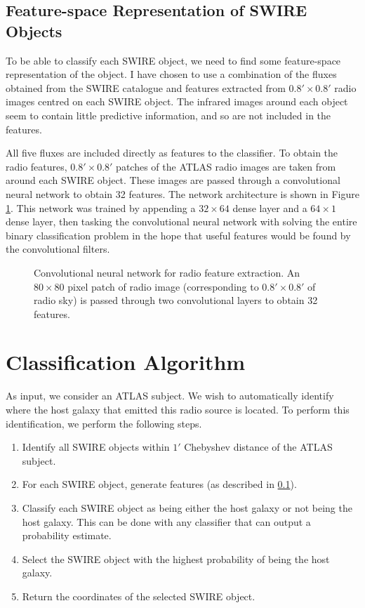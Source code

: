 \documentclass[a4paper]{article}
\newcommand{\fig}{Figure }
\begin{document}
    \subsection{Feature-space Representation of SWIRE Objects}
    \label{sec:features}

      To be able to classify each SWIRE object, we need to find some feature-space representation of the object. I have chosen to use a combination of the fluxes obtained from the SWIRE catalogue and features extracted from $0.8' \times 0.8'$ radio images centred on each SWIRE object. The infrared images around each object seem to contain little predictive information, and so are not included in the features.

      All five fluxes are included directly as features to the classifier. To obtain the radio features, $0.8' \times 0.8'$ patches of the ATLAS radio images are taken from around each SWIRE object. These images are passed through a convolutional neural network to obtain 32 features. The network architecture is shown in \fig \ref{fig:cnn}. This network was trained by appending a $32 \times 64$ dense layer and a $64 \times 1$ dense layer, then tasking the convolutional neural network with solving the entire binary classification problem in the hope that useful features would be found by the convolutional filters.

      \begin{figure}
        \centering
        
        \caption{Convolutional neural network for radio feature extraction. An $80 \times 80$ pixel patch of radio image (corresponding to $0.8' \times 0.8'$ of radio sky) is passed through two convolutional layers to obtain 32 features.}
        \label{fig:cnn}
      \end{figure}

  \section{Classification Algorithm}

    As input, we consider an ATLAS subject. We wish to automatically identify where the host galaxy that emitted this radio source is located. To perform this identification, we perform the following steps.

    \begin{enumerate}
      \item Identify all SWIRE objects within $1'$ Chebyshev distance of the ATLAS subject.
      \item For each SWIRE object, generate features (as described in \ref{sec:features}).
      \item Classify each SWIRE object as being either the host galaxy or not being the host galaxy. This can be done with any classifier that can output a probability estimate.
      \item Select the SWIRE object with the highest probability of being the host galaxy.
      \item Return the coordinates of the selected SWIRE object.
    \end{enumerate}
\end{document}
